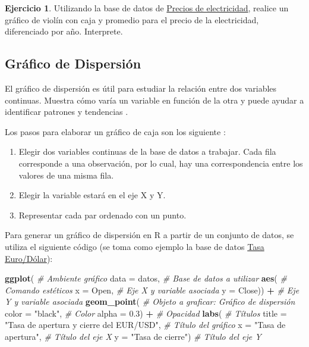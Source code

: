 \documentclass[
  11pt,
]{book}
\newenvironment{Shaded}{\begin{snugshade}}{\end{snugshade}}
\newcommand{\AttributeTok}[1]{\textcolor[rgb]{0.13,0.29,0.53}{#1}}
\newcommand{\CommentTok}[1]{\textcolor[rgb]{0.56,0.35,0.01}{\textit{#1}}}
\newcommand{\FloatTok}[1]{\textcolor[rgb]{0.00,0.00,0.81}{#1}}
\newcommand{\FunctionTok}[1]{\textcolor[rgb]{0.13,0.29,0.53}{\textbf{#1}}}
\newcommand{\NormalTok}[1]{#1}
\newcommand{\SpecialCharTok}[1]{\textcolor[rgb]{0.81,0.36,0.00}{\textbf{#1}}}
\newcommand{\StringTok}[1]{\textcolor[rgb]{0.31,0.60,0.02}{#1}}
\providecommand{\tightlist}{%
  \setlength{\itemsep}{0pt}\setlength{\parskip}{0pt}}
\theoremstyle{definition}
\theoremstyle{definition}
\theoremstyle{definition}
\newtheorem{exercise}{Ejercicio}[chapter]
\theoremstyle{definition}
\theoremstyle{remark}
\begin{document}
\begin{exercise}
Utilizando la base de datos de \hyperref[PreciosElectricidad]{Precios de electricidad}, realice un gráfico de violín con caja y promedio para el precio de la electricidad, diferenciado por año. Interprete.
\end{exercise}

\subsection{Gráfico de Dispersión}\label{topicos-graficos-dispersion}

El gráfico de dispersión es útil para estudiar la relación entre dos variables continuas. Muestra cómo varía un variable en función de la otra y puede ayudar a identificar patrones y tendencias \citep{rowlingson2016data}.

Los pasos para elaborar un gráfico de caja son los siguiente \citep{healy2019data}:

\begin{enumerate}
\def\labelenumi{\arabic{enumi}.}
\tightlist
\item
  Elegir dos variables continuas de la base de datos a trabajar. Cada fila corresponde a una observación, por lo cual, hay una correspondencia entre los valores de una misma fila.
\item
  Elegir la variable estará en el eje X y Y.
\item
  Representar cada par ordenado con un punto.
\end{enumerate}

Para generar un gráfico de dispersión en R a partir de un conjunto de datos, se utiliza el siguiente código (se toma como ejemplo la base de datos \hyperref[TasaEURUSD]{Tasa Euro/Dólar}):

\begin{Shaded}
\begin{Highlighting}[]
\FunctionTok{ggplot}\NormalTok{( }\CommentTok{\# Ambiente gráfico}
  \AttributeTok{data =}\NormalTok{ datos, }\CommentTok{\# Base de datos a utilizar}
  \FunctionTok{aes}\NormalTok{( }\CommentTok{\# Comando estéticos}
    \AttributeTok{x =}\NormalTok{ Open, }\CommentTok{\# Eje X y variable asociada}
    \AttributeTok{y =}\NormalTok{ Close)) }\SpecialCharTok{+} \CommentTok{\# Eje Y y variable asociada}
  \FunctionTok{geom\_point}\NormalTok{( }\CommentTok{\# Objeto a graficar: Gráfico de dispersión}
    \AttributeTok{color =} \StringTok{"black"}\NormalTok{, }\CommentTok{\# Color}
    \AttributeTok{alpha =} \FloatTok{0.3}\NormalTok{) }\SpecialCharTok{+} \CommentTok{\# Opacidad}
  \FunctionTok{labs}\NormalTok{( }\CommentTok{\# Títulos}
    \AttributeTok{title =} \StringTok{"Tasa de apertura y cierre del EUR/USD"}\NormalTok{, }\CommentTok{\# Título del gráfico}
    \AttributeTok{x =} \StringTok{"Tasa de apertura"}\NormalTok{, }\CommentTok{\# Título del eje X}
    \AttributeTok{y =} \StringTok{"Tasa de cierre"}\NormalTok{) }\CommentTok{\# Título del eje Y}
\end{Highlighting}
\end{Shaded}
\end{document}
